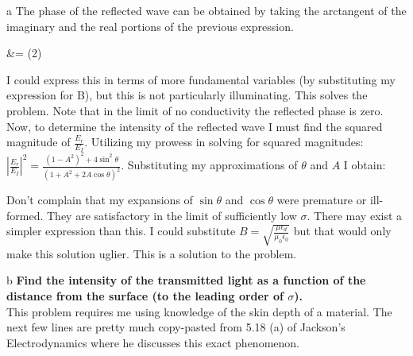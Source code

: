 \begin{homeworkProblem}
\begin{homeworkSection}{a}
The phase of the reflected wave can be obtained by taking the arctangent of the imaginary and the real portions of the previous expression.

\begin{problemAnswer}{\Phi &= \arctan(2)}\end{problemAnswer}

I could express this in terms of more fundamental variables (by substituting my expression for B), but this is not particularly illuminating. This solves the problem. Note that in the limit of no conductivity the reflected phase is zero.
\\

Now, to determine the intensity of the reflected wave I must find the squared magnitude of $\frac{E_r}{E_I}$. Utilizing my prowess in solving for squared magnitudes: $|\frac{E_r}{E_I}|^2 = \frac{(1-A^2)^2+4\sin^2\theta}{(1+A^2+2A\cos\theta)^2}$. Substituting my approximations of $\theta$ and $A$ I obtain:
\begin{problemAnswer}{ }\end{problemAnswer}

Don't complain that my expansions of $\sin\theta$ and $\cos\theta$ were premature or ill-formed. They are satisfactory in the limit of sufficiently low $\sigma$. There may exist a simpler expression than this. I could substitute $B = \sqrt{\frac{\mu\epsilon_d}{\mu_0 \epsilon_0}}$ but that would only make this solution uglier. This is a solution to the problem. 

\end{homeworkSection}

\begin{homeworkSection}{b}
\textbf{Find the intensity of the transmitted light as a function of the distance from the surface (to the
leading order of $\sigma$).}
\\

This problem requires me using knowledge of the skin depth of a material. The next few lines are pretty much copy-pasted from 5.18 (a) of Jackson's Electrodynamics where he discusses this exact phenomenon.
\\


\end{homeworkSection}
\end{homeworkProblem}
